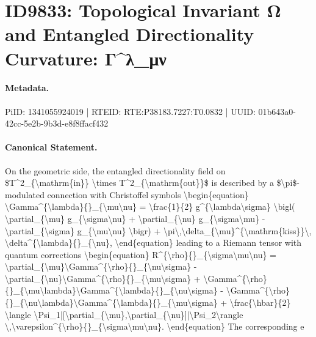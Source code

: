\section*{ID9833: Topological Invariant Ω and Entangled Directionality Curvature: Γ\textasciicircum{}λ\_μν}
\paragraph{Metadata.}
PiID: 1341055924019 | RTEID: RTE:P38183.7227:T0.0832 | UUID: 01b643a0-42cc-5e2b-9b3d-e8f8ffacf432

\paragraph{Canonical Statement.}
On the geometric side, the entangled directionality field on \$T\textasciicircum{}2\_\{\textbackslash{}mathrm\{in\}\} \textbackslash{}times T\textasciicircum{}2\_\{\textbackslash{}mathrm\{out\}\}\$ is described by a \$\textbackslash{}pi\$-modulated connection with Christoffel symbols \textbackslash{}begin\{equation\} \textbackslash{}Gamma\textasciicircum{}\{\textbackslash{}lambda\}\{\}\_\{\textbackslash{}mu\textbackslash{}nu\} = \textbackslash{}frac\{1\}\{2\} g\textasciicircum{}\{\textbackslash{}lambda\textbackslash{}sigma\} \textbackslash{}bigl( \textbackslash{}partial\_\{\textbackslash{}mu\} g\_\{\textbackslash{}sigma\textbackslash{}nu\} + \textbackslash{}partial\_\{\textbackslash{}nu\} g\_\{\textbackslash{}sigma\textbackslash{}mu\} - \textbackslash{}partial\_\{\textbackslash{}sigma\} g\_\{\textbackslash{}mu\textbackslash{}nu\} \textbackslash{}bigr) + \textbackslash{}pi\textbackslash{},\textbackslash{}delta\_\{\textbackslash{}mu\}\textasciicircum{}\{\textbackslash{}mathrm\{kiss\}\}\textbackslash{}, \textbackslash{}delta\textasciicircum{}\{\textbackslash{}lambda\}\{\}\_\{\textbackslash{}nu\}, \textbackslash{}end\{equation\} leading to a Riemann tensor with quantum corrections \textbackslash{}begin\{equation\} R\textasciicircum{}\{\textbackslash{}rho\}\{\}\_\{\textbackslash{}sigma\textbackslash{}mu\textbackslash{}nu\} = \textbackslash{}partial\_\{\textbackslash{}mu\}\textbackslash{}Gamma\textasciicircum{}\{\textbackslash{}rho\}\{\}\_\{\textbackslash{}nu\textbackslash{}sigma\} - \textbackslash{}partial\_\{\textbackslash{}nu\}\textbackslash{}Gamma\textasciicircum{}\{\textbackslash{}rho\}\{\}\_\{\textbackslash{}mu\textbackslash{}sigma\} + \textbackslash{}Gamma\textasciicircum{}\{\textbackslash{}rho\}\{\}\_\{\textbackslash{}mu\textbackslash{}lambda\}\textbackslash{}Gamma\textasciicircum{}\{\textbackslash{}lambda\}\{\}\_\{\textbackslash{}nu\textbackslash{}sigma\} - \textbackslash{}Gamma\textasciicircum{}\{\textbackslash{}rho\}\{\}\_\{\textbackslash{}nu\textbackslash{}lambda\}\textbackslash{}Gamma\textasciicircum{}\{\textbackslash{}lambda\}\{\}\_\{\textbackslash{}mu\textbackslash{}sigma\} + \textbackslash{}frac\{\textbackslash{}hbar\}\{2\} \textbackslash{}langle \textbackslash{}Psi\_1|[\textbackslash{}partial\_\{\textbackslash{}mu\},\textbackslash{}partial\_\{\textbackslash{}nu\}]|\textbackslash{}Psi\_2\textbackslash{}rangle \textbackslash{},\textbackslash{}varepsilon\textasciicircum{}\{\textbackslash{}rho\}\{\}\_\{\textbackslash{}sigma\textbackslash{}mu\textbackslash{}nu\}. \textbackslash{}end\{equation\} The corresponding e

